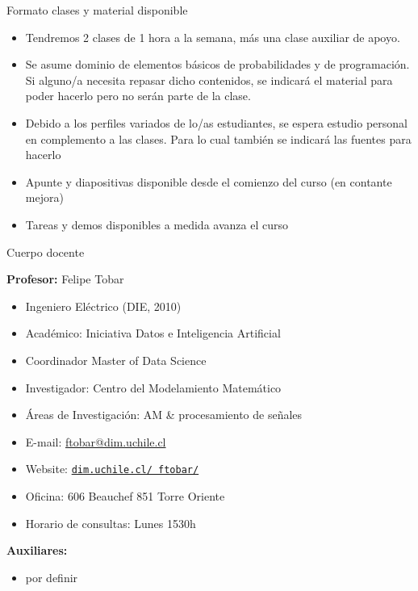 \documentclass[9pt]{beamer}
\begin{document}
\begin{frame}{Formato clases y material disponible}


\begin{itemize}
  \item Tendremos 2 clases de 1 hora a la semana, más una clase auxiliar de apoyo. 
  \item Se asume dominio de elementos básicos de probabilidades y de programación. Si alguno/a necesita repasar dicho contenidos, se indicará el material para poder hacerlo pero no serán parte de la clase. 
  \item Debido a los perfiles variados de lo/as estudiantes, se espera estudio personal en complemento a las clases. Para lo cual también se indicará las fuentes para hacerlo
  \item Apunte y diapositivas disponible desde el comienzo del curso (en contante mejora)
  \item Tareas y demos disponibles a medida avanza el curso
\end{itemize}
\vfill


\end{frame}


\begin{frame}{Cuerpo docente}

\textbf{Profesor:} Felipe Tobar
\begin{itemize}
  \item Ingeniero Eléctrico (DIE, 2010) 
  \item Académico: Iniciativa Datos e Inteligencia Artificial 
  \item Coordinador Master of Data Science 
  \item Investigador: Centro del Modelamiento Matemático 
  \item Áreas de Investigación: AM \& procesamiento de señales
  \item E-mail: \url{ftobar@dim.uchile.cl}
  \item Website: \href{http://www.dim.uchile.cl/~ftobar/}{\tt dim.uchile.cl/~ftobar/} 
  \item Oficina: 606 Beauchef 851 Torre Oriente
  \item Horario de consultas: Lunes 1530h
\end{itemize}

\vfill
\textbf{Auxiliares:}
\begin{itemize}
  \item por definir
\end{itemize}


\end{frame}
\end{document}
